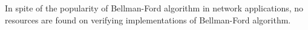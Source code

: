 In spite of the popularity of Bellman-Ford algorithm in network applications, no resources are found on verifying implementations of Bellman-Ford algorithm.

